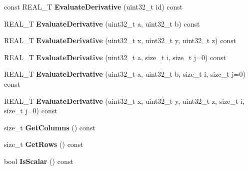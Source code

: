 \begin{DoxyCompactItemize}
\item 
\hypertarget{structatl_1_1_multiply_adac83a483dd8268e7d0d0e38d1235bad}{const R\+E\+A\+L\+\_\+\+T {\bfseries Evaluate\+Derivative} (uint32\+\_\+t id) const }\label{structatl_1_1_multiply_adac83a483dd8268e7d0d0e38d1235bad}

\item 
\hypertarget{structatl_1_1_multiply_a2bf46a9ea8e1c71ffe8f9c79f4f98767}{R\+E\+A\+L\+\_\+\+T {\bfseries Evaluate\+Derivative} (uint32\+\_\+t a, uint32\+\_\+t b) const }\label{structatl_1_1_multiply_a2bf46a9ea8e1c71ffe8f9c79f4f98767}

\item 
\hypertarget{structatl_1_1_multiply_a9dbc68b47f2687a2a3e510b1e30b25e1}{R\+E\+A\+L\+\_\+\+T {\bfseries Evaluate\+Derivative} (uint32\+\_\+t x, uint32\+\_\+t y, uint32\+\_\+t z) const }\label{structatl_1_1_multiply_a9dbc68b47f2687a2a3e510b1e30b25e1}

\item 
\hypertarget{structatl_1_1_multiply_a0756c346a650747f8ffc4a63b8019586}{R\+E\+A\+L\+\_\+\+T {\bfseries Evaluate\+Derivative} (uint32\+\_\+t a, size\+\_\+t i, size\+\_\+t j=0) const }\label{structatl_1_1_multiply_a0756c346a650747f8ffc4a63b8019586}

\item 
\hypertarget{structatl_1_1_multiply_a869b949cd670c488f1999afe5bb9b187}{R\+E\+A\+L\+\_\+\+T {\bfseries Evaluate\+Derivative} (uint32\+\_\+t a, uint32\+\_\+t b, size\+\_\+t i, size\+\_\+t j=0) const }\label{structatl_1_1_multiply_a869b949cd670c488f1999afe5bb9b187}

\item 
\hypertarget{structatl_1_1_multiply_ad96c2a68a427fb698c6a415a37fbec2b}{R\+E\+A\+L\+\_\+\+T {\bfseries Evaluate\+Derivative} (uint32\+\_\+t x, uint32\+\_\+t y, uint32\+\_\+t z, size\+\_\+t i, size\+\_\+t j=0) const }\label{structatl_1_1_multiply_ad96c2a68a427fb698c6a415a37fbec2b}

\item 
\hypertarget{structatl_1_1_multiply_ad0be7a6012b64cd7d0991580e92d63cb}{size\+\_\+t {\bfseries Get\+Columns} () const }\label{structatl_1_1_multiply_ad0be7a6012b64cd7d0991580e92d63cb}

\item 
\hypertarget{structatl_1_1_multiply_a38339891d6ef8ee51ad41376f3dcc222}{size\+\_\+t {\bfseries Get\+Rows} () const }\label{structatl_1_1_multiply_a38339891d6ef8ee51ad41376f3dcc222}

\item 
\hypertarget{structatl_1_1_multiply_ab7b229dc85f278cd1e734d818b2cfe82}{bool {\bfseries Is\+Scalar} () const }\label{structatl_1_1_multiply_ab7b229dc85f278cd1e734d818b2cfe82}


\end{DoxyCompactItemize}
